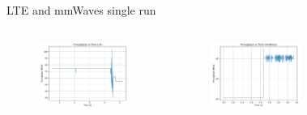 \documentclass{beamer}
\begin{document}
	\begin{frame}{LTE and mmWaves single run}
		\begin{columns}
				\begin{figure}
					\vspace{-0.1in}
					\includegraphics[scale=0.28]{throughput_lte_UDP}
				\end{figure}
				\begin{figure}
					\vspace{-0.2in}
					\includegraphics[scale=0.28]{throughput_mmWaves_UDP}
				\end{figure}
				\begin{figure}
					\vspace{-0.1in}

\end{figure}
\end{columns}
\end{frame}
\end{document}
